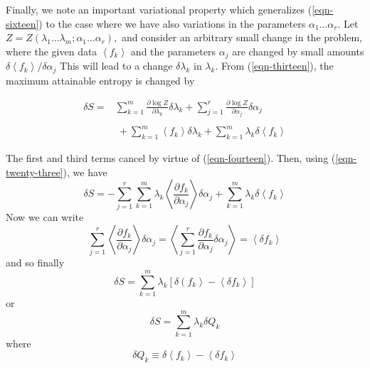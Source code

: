 \documentclass[]{article}
\begin{document}
Finally, we note an important variational property which generalizes
(\ref{eqn-sixteen}) to the case where we have also variations in the parameters
\(\alpha_{1}\ldots\alpha_{r}.\) Let
\(Z = Z\left( \lambda_{1}\ldots\lambda_{m};\alpha_{1}\ldots\alpha_{r} \right),\)
and consider an arbitrary small change in the problem, where the given
data \(\left\langle f_{k} \right\rangle\) and the parameters
\(\alpha_{j}\) are changed by small amounts
\(\delta\left\langle f_{k} \right\rangle/\delta\alpha_{j}\) This will
lead to a change \(\delta\lambda_{k}\) in \(\lambda_{k}\). From (\ref{eqn-thirteen}),
the maximum attainable entropy is changed by

\begin{align}
\delta S = & \sum_{k = 1}^{m}  \frac{\partial  \log Z}{\partial\lambda_{k}}\delta\lambda_{k} + \sum_{j = 1}^{r}  \frac{\partial  \log Z}{\partial\alpha_{j}}\delta\alpha_{j} \nonumber \\
\label{eqn-twenty-four} \\
 & \  + \sum_{k = 1}^{m}  \left\langle f_{k} \right\rangle\delta\lambda_{k} + \sum_{k = 1}^{m}  \lambda_{k}\delta\left\langle f_{k} \right\rangle \nonumber
\end{align}

The first and third terms cancel by virtue of (\ref{eqn-fourteen}). Then, using (\ref{eqn-twenty-three}), we
have
%
\begin{equation}
\delta S = - \sum_{j = 1}^{r} \sum_{k = 1}^{m} \lambda_{k}\left\langle \frac{\partial f_{k}}{\partial\alpha_{j}} \right\rangle\delta\alpha_{j} + \sum_{k = 1}^{m} \lambda_{k}\delta\left\langle f_{k} \right\rangle
\end{equation}
%
Now we can write
%
\begin{equation}
\sum_{j = 1}^{r} \left\langle \frac{\partial f_{k}}{\partial\alpha_{j}} \right\rangle\delta\alpha_{j} = \left\langle \sum_{j = 1}^{r}  \frac{\partial f_{k}}{\partial\alpha_{j}}\delta\alpha_{j} \right\rangle = \left\langle \delta f_{k} \right\rangle
\end{equation}
%
and so finally
%
\begin{equation}
\delta S = \sum_{k = 1}^{m} \lambda_{k}\left\lbrack \delta\left( f_{k} \right\rangle - \left\langle \delta f_{k} \right\rangle \right\rbrack
\end{equation}
%
or
%
\begin{equation}
\delta S = \sum_{k = 1}^{m} \lambda_{k}\delta Q_{k} \label{eqn-twenty-eight}
\end{equation}
%
where
%
\begin{equation}
\delta Q_{k} \equiv \delta\left\langle f_{k} \right\rangle - \left\langle \delta f_{k} \right\rangle \label{eqn-twenty-nine}
\end{equation}
\end{document}
